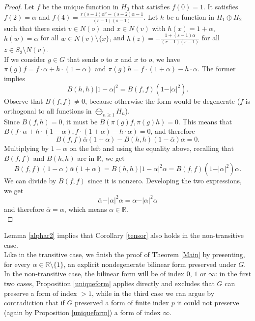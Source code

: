 \documentclass{article}
\theoremstyle{definition}
\theoremstyle{remark}
\theoremstyle{plain}
\begin{document}
\begin{proof}
Let $f$ be the unique function in $H_0$ that satisfies $f(0)=1$. It satisfies $f(2)=\alpha$ and $f(4)=\frac{r(s-1)\alpha^2-(s-2)\alpha-1}{(r-1)(s-1)}$. Let $h$ be a function in $H_1\oplus H_2$ such that there exist $v\in N(o)$ and $x\in N(v)$ with $h(x)=1+\alpha$, $h(w)=\alpha$ for all $w\in N(v)\setminus\{x\}$, and $h(z)=-\frac{1+(s-1)\alpha}{(r-1)(s-1)}$ for all $z\in S_2\setminus N(v)$. \\

If we consider $g\in G$ that sends $o$ to $x$ and $x$ to $o$, we have $\pi(g)f=f\cdot\alpha+h\cdot(1-\alpha)$ and $\pi(g)h=f\cdot(1+\alpha)-h\cdot\alpha$. The former implies $$B(h,h)\vert 1-\alpha\vert^2=B(f,f)\left(1-\vert\alpha\vert^2\right).$$ Observe that $B(f,f)\neq 0$, because otherwise the form would be degenerate ($f$ is orthogonal to all functions in $\bigoplus_{n\geq 1}{H_n}$). \\

Since $B(f,h)=0$, it must be $B(\pi(g)f,\pi(g)h)=0$. This means that $B(f\cdot\alpha+h\cdot(1-\alpha),f\cdot(1+\alpha)-h\cdot\alpha)=0$, and therefore $$B(f,f)\overline{\alpha}(1+\alpha)-B(h,h)(1-\overline{\alpha})\alpha=0.$$ Multiplying by $1-\alpha$ on the left and using the equality above, recalling that $B(f,f)$ and $B(h,h)$ are in $\mathbb{R}$, we get $$B(f,f)(1-\alpha)\overline{\alpha}(1+\alpha)=B(h,h)\vert 1-\alpha\vert^2\alpha=B(f,f)\left(1-\vert\alpha\vert^2\right)\alpha.$$ We can divide by $B(f,f)$ since it is nonzero. Developing the two expressions, we get $$\overline{\alpha}-\vert\alpha\vert^2\alpha=\alpha-\vert\alpha\vert^2\alpha$$ and therefore $\overline{\alpha}=\alpha$, which means $\alpha\in\mathbb{R}$. \\
\end{proof}

Lemma \ref{alphar2} implies that Corollary \ref{tensor} also holds in the non-transitive case. \\

Like in the transitive case, we finish the proof of Theorem \ref{Main} by presenting, for every $\alpha\in\mathbb{R}\setminus\{1\}$, an explicit nondegenerate bilinear form preserved under $G$. In the non-transitive case, the bilinear form will be of index $0$, $1$ or $\infty$: in the first two cases, Proposition \ref{uniqueform} applies directly and excludes that $G$ can preserve a form of index $>1$, while in the third case we can argue by contradiction that if $G$ preserved a form of finite index $p$ it could not preserve (again by Proposition \ref{uniqueform}) a form of index $\infty$. \\
\end{document}
